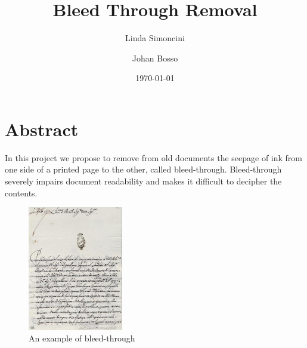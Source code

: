 \documentclass[%
 reprint,
 amsmath,amssymb,
 aps,
]{revtex4-1}
\begin{document}

\title{Bleed Through Removal}%


\author{Linda Simoncini}

\author{Johan Bosso}%


\date{\today}%


\maketitle


\section{\label{sec:level1}Abstract}

In this project we propose to remove from old documents the seepage of ink from one side of a printed page to the other, called bleed-through.
Bleed-through severely impairs document readability and makes it difficult to decipher the contents.
\begin{figure}[!ht]
	\centering
	\includegraphics[width=0.37\textwidth]{24}
	\caption{An example of bleed-through}
	\centering
	\label{label:graph}
\end{figure}
\end{document}
